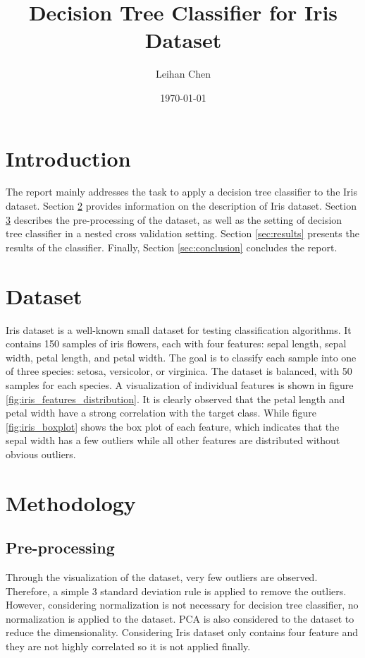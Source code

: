 \documentclass[12pt,a4paper]{article}
\title{Decision Tree Classifier for Iris Dataset}
\author{Leihan Chen}
\date{\today}
\begin{document}

\section{Introduction}
The report mainly addresses the task to apply a decision tree classifier to the Iris dataset\cite{iris_53}. Section \ref{sec:dataset}
provides information on the description of Iris dataset. 
Section \ref{sec:methodology} describes the pre-processing of the dataset, 
as well as the setting of decision tree classifier in a nested cross validation setting. 
Section \ref{sec:results} presents the results of the classifier. Finally, Section \ref{sec:conclusion} concludes the report. 


\section{Dataset}\label{sec:dataset}
Iris dataset is a well-known small dataset for testing classification algorithms. It contains 150 samples of iris flowers, each with four features: sepal length, sepal width, petal length, and petal width. 
The goal is to classify each sample into one of three species: setosa, versicolor, or virginica. The dataset is balanced, with 50 samples for each species. 
A visualization of individual features is shown in figure \ref{fig:iris_features_distribution}.
It is clearly observed that the petal length and petal width have a strong correlation with the target class. 
While figure \ref{fig:iris_boxplot} shows the box plot of each feature, which indicates that the sepal width has a few outliers while all other features are distributed without obvious outliers.

\section{Methodology}\label{sec:methodology}
\subsection{Pre-processing}\label{subsec:preprocessing}
Through the visualization of the dataset, very few outliers are observed. Therefore, a simple 3 standard deviation rule is applied to remove the outliers.
However, considering normalization is not necessary for decision tree classifier, no normalization is applied to the dataset. 
PCA\cite{MACKIEWICZ1993303} is also considered to the dataset to reduce the dimensionality.
Considering Iris dataset only contains four feature and they are not highly correlated so it is not applied finally.
\end{document}
